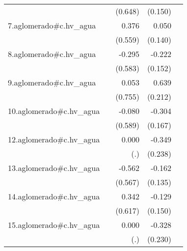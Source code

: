 {\begin{longtable}{l*{4}{D{.}{.}{-1}}}
            &                     &     (0.648)         &     (0.150)         &                     \\
\addlinespace
7.aglomerado#c.hv\_agua&                     &       0.376         &       0.050         &                     \\
            &                     &     (0.559)         &     (0.140)         &                     \\
\addlinespace
8.aglomerado#c.hv\_agua&                     &      -0.295         &      -0.222         &                     \\
            &                     &     (0.583)         &     (0.152)         &                     \\
\addlinespace
9.aglomerado#c.hv\_agua&                     &       0.053         &       0.639\sym{**} &                     \\
            &                     &     (0.755)         &     (0.212)         &                     \\
\addlinespace
10.aglomerado#c.hv\_agua&                     &      -0.080         &      -0.304         &                     \\
            &                     &     (0.589)         &     (0.167)         &                     \\
\addlinespace
12.aglomerado#c.hv\_agua&                     &       0.000         &      -0.349         &                     \\
            &                     &         (.)         &     (0.238)         &                     \\
\addlinespace
13.aglomerado#c.hv\_agua&                     &      -0.562         &      -0.162         &                     \\
            &                     &     (0.567)         &     (0.135)         &                     \\
\addlinespace
14.aglomerado#c.hv\_agua&                     &       0.342         &      -0.129         &                     \\
            &                     &     (0.617)         &     (0.150)         &                     \\
\addlinespace
15.aglomerado#c.hv\_agua&                     &       0.000         &      -0.328         &                     \\
            &                     &         (.)         &     (0.230)         &                     \\

\end{longtable}}

